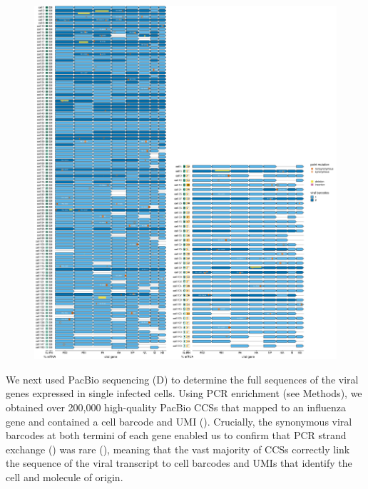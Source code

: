 \documentclass[9pt,lineno]{template}
\begin{document}
\begin{figure}
\begin{fullwidth}
{\includegraphics[width=\textwidth]{figures/single_cell_figures/p_genotypes_by_ifn.pdf}}
\label{figsupp:genotypes_by_ifn}

\label{figdata:primer_sequences}

\label{figdata:genotypes}

\end{fullwidth}
\end{figure}

We next used PacBio sequencing (D) to determine the full sequences of the viral genes expressed in single infected cells.
Using PCR enrichment (see Methods), we obtained over 200,000 high-quality PacBio CCSs that mapped to an influenza gene and contained a cell barcode and UMI ().
Crucially, the synonymous viral barcodes at both termini of each gene enabled us to confirm that PCR strand exchange () was rare  (), meaning that the vast majority of CCSs correctly link the sequence of the viral transcript to cell barcodes and UMIs that identify the cell and molecule of origin.
\end{document}
